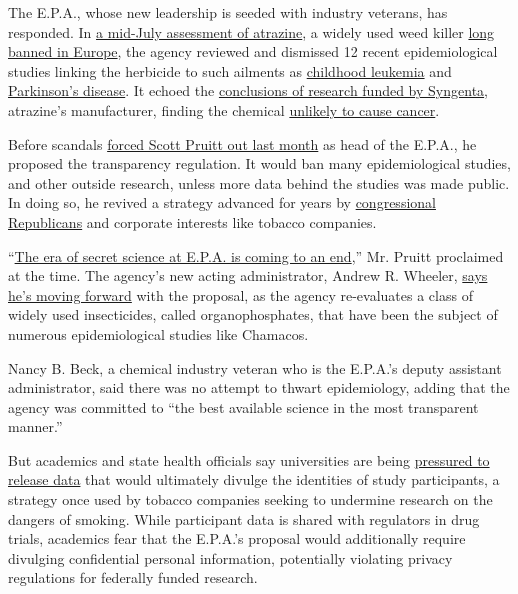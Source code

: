 The E.P.A., whose new leadership is seeded with industry veterans, has
responded. In
\href{https://www.documentcloud.org/documents/4639871-2018-07-10-Atazine-Draft-Human-Health-Assessment.html}{a
mid-July assessment of atrazine}, a widely used weed killer
\href{https://www.nytimes3xbfgragh.onion/2015/02/24/business/international/a-pesticide-banned-or-not-underscores-trans-atlantic-trade-sensitivities.html}{long
banned in Europe}, the agency reviewed and dismissed 12 recent
epidemiological studies linking the herbicide to such ailments as
\href{https://www.ncbi.nlm.nih.gov/pubmed/26025512}{childhood leukemia}
and \href{https://www.ncbi.nlm.nih.gov/pubmed/25939349}{Parkinson's
disease}. It echoed the
\href{http://www.atrazine.com/human-health.aspx}{conclusions of research
funded by Syngenta}, atrazine's manufacturer, finding the chemical
\href{https://academic.oup.com/toxsci/article/123/2/441/1683036}{unlikely
to cause cancer}.

Before scandals
\href{https://www.nytimes3xbfgragh.onion/2018/07/05/climate/scott-pruitt-epa-trump.html}{forced
Scott Pruitt out last month} as head of the E.P.A., he proposed the
transparency regulation. It would ban many epidemiological studies, and
other outside research, unless more data behind the studies was made
public. In doing so, he revived a strategy advanced for years by
\href{http://www.sciencemag.org/news/2015/03/house-approves-epa-secret-science-bills-despite-white-house-veto-threat}{congressional
Republicans} and corporate interests like tobacco companies.

``\href{https://www.epa.gov/newsreleases/epa-administrator-pruitt-proposes-rule-strengthen-science-used-epa-regulations}{The
era of secret science at E.P.A. is coming to an end},'' Mr. Pruitt
proclaimed at the time. The agency's new acting administrator, Andrew R.
Wheeler,
\href{https://www.eenews.net/eenewspm/stories/1060089083/search?keyword=wheeler}{says
he's moving forward} with the proposal, as the agency re-evaluates a
class of widely used insecticides, called organophosphates, that have
been the subject of numerous epidemiological studies like Chamacos.

Nancy B. Beck, a chemical industry veteran who is the E.P.A.'s deputy
assistant administrator, said there was no attempt to thwart
epidemiology, adding that the agency was committed to ``the best
available science in the most transparent manner.''

But academics and state health officials say universities are being
\href{https://www.documentcloud.org/documents/4639885-2018-8-7-Harvard-Letter-to-EPA-Document-Pm-03.html}{pressured
to release data} that would ultimately divulge the identities of study
participants, a strategy once used by tobacco companies seeking to
undermine research on the dangers of smoking. While participant data is
shared with regulators in drug trials, academics fear that the E.P.A.'s
proposal would additionally require divulging confidential personal
information, potentially violating privacy regulations for federally
funded research.

